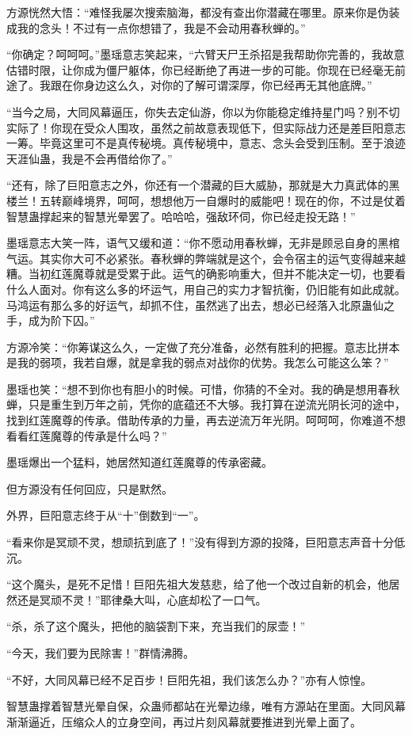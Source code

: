 \begin{this_body}
方源恍然大悟：“难怪我屡次搜索脑海，都没有查出你潜藏在哪里。原来你是伪装成我的念头！不过有一点你想错了，我是不会动用春秋蝉的。”

“你确定？呵呵呵。”墨瑶意志笑起来，“六臂天尸王杀招是我帮助你完善的，我故意估错时限，让你成为僵尸躯体，你已经断绝了再进一步的可能。你现在已经毫无前途了。我跟在你身边这么久，对你的了解可谓深厚，你已经再无其他底牌。”

“当今之局，大同风幕逼压，你失去定仙游，你以为你能稳定维持星门吗？别不切实际了！你现在受众人围攻，虽然之前故意表现低下，但实际战力还是差巨阳意志一筹。毕竟这里可不是真传秘境。真传秘境中，意志、念头会受到压制。至于浪迹天涯仙蛊，我是不会再借给你了。”

“还有，除了巨阳意志之外，你还有一个潜藏的巨大威胁，那就是大力真武体的黑楼兰！五转巅峰境界，呵呵，想想他万一自爆时的威能吧！现在的你，不过是仗着智慧蛊撑起来的智慧光晕罢了。哈哈哈，强敌环伺，你已经走投无路！”

墨瑶意志大笑一阵，语气又缓和道：“你不愿动用春秋蝉，无非是顾忌自身的黑棺气运。其实你大可不必紧张。春秋蝉的弊端就是这个，会令宿主的运气变得越来越糟。当初红莲魔尊就是受累于此。运气的确影响重大，但并不能决定一切，也要看什么人面对。你有这么多的坏运气，用自己的实力才智抗衡，仍旧能有如此成就。马鸿运有那么多的好运气，却抓不住，虽然逃了出去，想必已经落入北原蛊仙之手，成为阶下囚。”

方源冷笑：“你筹谋这么久，一定做了充分准备，必然有胜利的把握。意志比拼本是我的弱项，我若自爆，就是拿我的弱点对战你的优势。我怎么可能这么笨？”

墨瑶也笑：“想不到你也有胆小的时候。可惜，你猜的不全对。我的确是想用春秋蝉，只是重生到万年之前，凭你的底蕴还不大够。我打算在逆流光阴长河的途中，找到红莲魔尊的传承。借助传承的力量，再去逆流万年光阴。呵呵呵，你难道不想看看红莲魔尊的传承是什么吗？”

墨瑶爆出一个猛料，她居然知道红莲魔尊的传承密藏。

但方源没有任何回应，只是默然。

外界，巨阳意志终于从“十”倒数到“一”。

“看来你是冥顽不灵，想顽抗到底了！”没有得到方源的投降，巨阳意志声音十分低沉。

“这个魔头，是死不足惜！巨阳先祖大发慈悲，给了他一个改过自新的机会，他居然还是冥顽不灵！”耶律桑大叫，心底却松了一口气。

“杀，杀了这个魔头，把他的脑袋割下来，充当我们的尿壶！”

“今天，我们要为民除害！”群情沸腾。

“不好，大同风幕已经不足百步！巨阳先祖，我们该怎么办？”亦有人惊惶。

智慧蛊撑着智慧光晕自保，众蛊师都站在光晕边缘，唯有方源站在里面。大同风幕渐渐逼近，压缩众人的立身空间，再过片刻风幕就要推进到光晕上面了。

\end{this_body}

